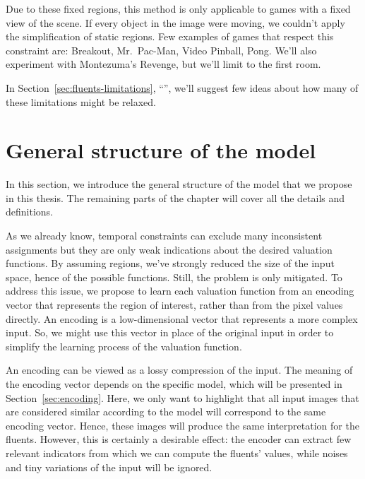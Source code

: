 Due to these fixed regions, this method is only applicable to games with a
fixed view of the scene. If every object in the image were moving, we
couldn't apply the simplification of static regions. Few examples of games
that respect this constraint are: Breakout, Mr.~Pac-Man, Video Pinball, Pong.
We'll also experiment with Montezuma's Revenge, but we'll limit to the first
room.

In Section~\ref{sec:fluents-limitations},
``'', we'll suggest few ideas about how many
of these limitations might be relaxed.


\section{General structure of the model}

\label{sec:model-structure}

In this section, we introduce the general structure of the model that we
propose in this thesis. The remaining parts of the chapter will cover all the
details and definitions.

As we already know, temporal constraints can exclude many inconsistent
assignments but they are only weak indications about the desired valuation
functions. By assuming regions, we've strongly reduced the size of the input
space, hence of the possible functions. Still, the problem is only mitigated.
To address this issue, we propose to learn each valuation function from an
encoding vector that represents the region of interest, rather than from the
pixel values directly. An encoding is a low-dimensional vector that represents
a more complex input. So, we might use this vector in place of the original
input in order to simplify the learning process of the valuation function.

An encoding can be viewed as a lossy compression of the input. The meaning of
the encoding vector depends on the specific model, which will be presented in
Section~\ref{sec:encoding}. Here, we only want to highlight that all input
images that are considered similar according to the model will correspond to
the same encoding vector. Hence, these images will produce the same
interpretation for the fluents. However, this is certainly a desirable effect:
the encoder can extract few relevant indicators from which we can compute the
fluents' values, while noises and tiny variations of the input will be
ignored.

